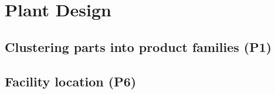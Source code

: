 \chapter{Plant Design} \label{chapProdPlantDesign}

\section{Clustering parts into product families (P1)}

\section{Facility location (P6)} \label{secFacilityLocationProd}